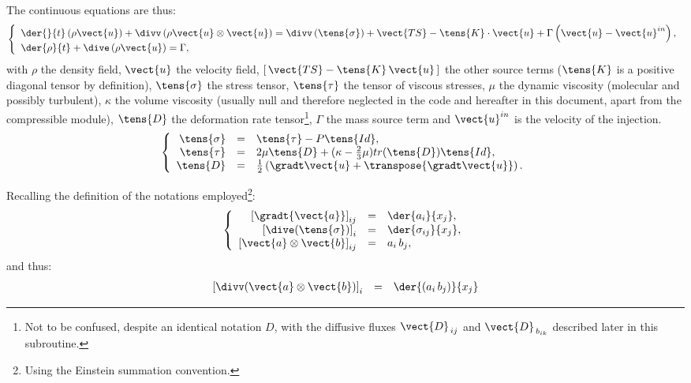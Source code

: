 The continuous equations are thus:
\begin{equation}
\left\{
\begin{array}{l}
\displaystyle \der{}{t} \left( \rho \vect{u} \right) + \divv \left( \rho  \vect{u} \otimes \vect{u} \right)
=\divv \left( \tens{\sigma} \right) + \vect{TS} - \tens{K} \cdot \vect{u} + \Gamma \left( \vect{u} - \vect{u}^{in}\right),\\
\der{\rho}{t} + \dive \left( \rho \vect{u} \right) = \Gamma ,
\end{array}\right.
\end{equation}
%
with $\rho$ the density field, $\vect{u}$ the velocity field,
$[\,\vect{TS}-\tens{K}\,\vect{u}\,]$ the other source terms ($\tens{K}$ is a
positive diagonal tensor by definition), $\tens{\sigma}$ the stress tensor,
$\tens{\tau}$ the tensor of viscous stresses,
$\mu$ the dynamic viscosity (molecular and possibly turbulent),
$\kappa$ the volume viscosity (usually null and therefore neglected in
the code and hereafter in this document, apart from the compressible module),
$\tens{D}$ the deformation rate tensor\footnote{Not to be confused,
despite an identical notation $D$, with the diffusive fluxes
$\vect{D}_{\,ij}$ and $\vect{D}_{\,{b}_{ik}}$ described later in this
subroutine.}, $\Gamma$ the mass source term and $\vect{u}^{in}$ is the velocity of the injection.
\begin{equation}
\left\{
\begin{array}{r c l}
\tens{\sigma} & = & \tens{\tau} - P\tens{Id} ,  \\
\tens{\tau} & = & 2 \mu  \tens{D} +  (\kappa  - \frac{2}{3}\mu) tr({\tens{D}})
\tens{Id} , \\
\tens{D} &=& \frac{1}{2}\left( \gradt\vect{u}+ \transpose{\gradt\vect{u}} \right).
\end{array}\right.
\end{equation}

Recalling the definition of the notations employed\footnote{Using the
Einstein summation convention.}:
\begin{equation}\notag
\left\{\begin{array}{r c l}
\left[\gradt{\vect{a}}\right]_{ij} &=& \der{a_i}{x_j},\\
\left[\dive(\tens{\sigma})\right]_i &=& \der{\sigma_{ij}}{x_j},\\
\left[\vect{a}\otimes\vect{b}\right]_{ij} &= &
a_i\,b_j,\\
\end{array}\right.
\end{equation}
and thus:
\begin{equation}\notag
\begin{array}{lll}
\left[\divv(\vect{a}\otimes\vect{b})\right]_i &= &
\der{(a_i\,b_j)}{x_j}
\end{array}
\end{equation}

